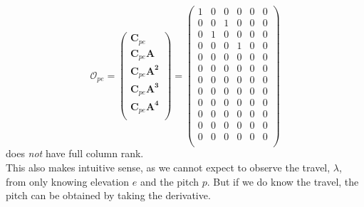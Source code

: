 \begin{equation}
    \mathbf{\mathcal{O}}_{pe} = 
        \begin{pmatrix}
        \mathbf{C}_{pe}               \\
        \mathbf{C}_{pe}\mathbf{A}     \\
        \mathbf{C}_{pe}\mathbf{A^2}   \\
        \mathbf{C}_{pe}\mathbf{A^3}   \\
        \mathbf{C}_{pe}\mathbf{A^4}   \\
    \end{pmatrix}
    = \begin{pmatrix}
    1 & 0 & 0 & 0 & 0 & 0 \\
    0 & 0 & 1 & 0 & 0 & 0 \\
    0 & 1 & 0 & 0 & 0 & 0 \\
    0 & 0 & 0 & 1 & 0 & 0 \\
    0 & 0 & 0 & 0 & 0 & 0 \\
    0 & 0 & 0 & 0 & 0 & 0 \\
    0 & 0 & 0 & 0 & 0 & 0 \\
    0 & 0 & 0 & 0 & 0 & 0 \\
    0 & 0 & 0 & 0 & 0 & 0 \\
    0 & 0 & 0 & 0 & 0 & 0 \\
    0 & 0 & 0 & 0 & 0 & 0 \\
    0 & 0 & 0 & 0 & 0 & 0 \\
    \end{pmatrix}
\end{equation}
does \textit{not} have full column rank.\\
This also makes intuitive sense, as we cannot expect to observe the travel, $\lambda$, from only knowing elevation $e$ and the pitch $p$. But if we do know the travel, the pitch can be obtained by taking the derivative.  

